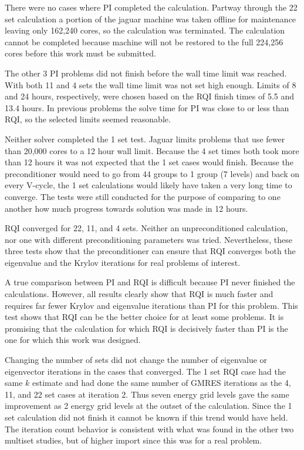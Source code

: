 There were no cases where PI completed the calculation. Partway through the 22 set calculation a portion of the jaguar machine was taken offline for maintenance leaving only 162,240 cores, so the calculation was terminated. The calculation cannot be completed because machine will not be restored to the full 224,256 cores before this work must be submitted. 

The other 3 PI problems did not finish before the wall time limit was reached. With both 11 and 4 sets the wall time limit was not set high enough. Limits of 8 and 24 hours, respectively, were chosen based on the RQI finish times of 5.5 and 13.4 hours. In previous problems the solve time for PI was close to or less than RQI, so the selected limits seemed reasonable. 

Neither solver completed the 1 set test. Jaguar limits problems that use fewer than 20,000 cores to a 12 hour wall limit. Because the 4 set times both took more than 12 hours it was not expected that the 1 set cases would finish. Because the preconditioner would need to go from 44 groups to 1 group (7 levels) and back on every V-cycle, the 1 set calculations would likely have taken a very long time to converge. The tests were still conducted for the purpose of comparing to one another how much progress towards solution was made in 12 hours. 

RQI converged for 22, 11, and 4 sets. Neither an unpreconditioned calculation, nor one with different preconditioning parameters was tried. Nevertheless, these three tests show that the preconditioner can ensure that RQI converges both the eigenvalue and the Krylov iterations for real problems of interest. 

A true comparison between PI and RQI is difficult because PI never finished the calculations. However, all results clearly show that RQI is much faster and requires far fewer Krylov and eigenvalue iterations than PI for this problem. This test shows that RQI can be the better choice for at least some problems. It is promising that the calculation for which RQI is decisively faster than PI is the one for which this work was designed. 

Changing the number of sets did not change the number of eigenvalue or eigenvector iterations in the cases that converged. The 1 set RQI case had the same $k$ estimate and had done the same number of GMRES iterations as the 4, 11, and 22 set cases at iteration 2. Thus seven energy grid levels gave the same improvement as 2 energy grid levels at the outset of the calculation. Since the 1 set calculation did not finish it cannot be known if this trend would have held. The iteration count behavior is consistent with what was found in the other two multiset studies, but of higher import since this was for a real problem.

